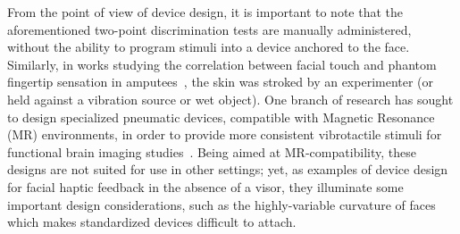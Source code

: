 From the point of view of device design, it is important to note that the aforementioned two-point discrimination tests are manually administered, without the ability to program stimuli into a device anchored to the face. Similarly, in works studying the correlation between facial touch and phantom fingertip sensation in amputees~\cite{ramachandran1998ThePO}, the skin was stroked by an experimenter (or held against a vibration source or wet object). One branch of research has sought to design specialized pneumatic devices, compatible with Magnetic Resonance (MR) environments, in order to provide more consistent vibrotactile stimuli for functional brain imaging studies~\cite{kikkert2023}. Being aimed at MR-compatibility, these designs are not suited for use in other settings; yet, as examples of device design for facial haptic feedback in the absence of a visor, they illuminate some important design considerations, such as the highly-variable curvature of faces which makes standardized devices difficult to attach.